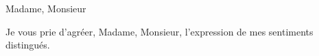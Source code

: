\documentclass[]{letter}
\begin{document}
	
	\begin{letter}{Madame, Monsieur}
		\address{}
		\date{16 décembre 2017}
		\opening{}
		\thispagestyle{fancy}
		{
			
			
			
		}
		
		\signature{
		}
		
		\closing{Je vous prie d'agréer, Madame, Monsieur, l'expression de mes sentiments distingués. }
		
		
	\end{letter}
\end{document}
